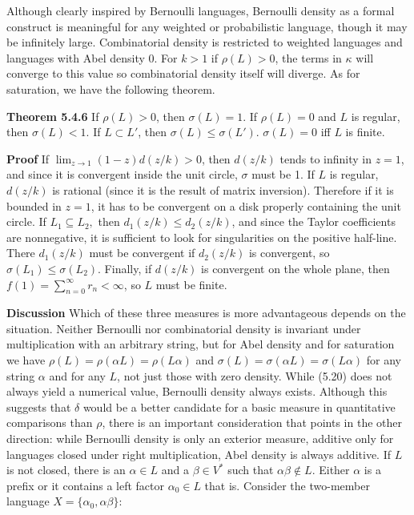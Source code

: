 Although clearly inspired by Bernoulli languages, Bernoulli density as a formal
construct is meaningful for any weighted or probabilistic language, though it
may be infinitely large. Combinatorial density is restricted to weighted
languages and languages with Abel density 0. For $k >1$ if $\rho(L)>0$, the
terms in $\kappa$ will converge to this value so combinatorial density itself
will diverge. As for saturation, we have the following theorem.

\medskip\noindent
{\bf Theorem 5.4.6} If $\rho(L) > 0$, then $\sigma(L)=1$. If $\rho(L) =0$ and
$L$ is regular, then $\sigma(L) < 1$. If $L \subset L'$, then $\sigma(L) \leq
\sigma(L')$. $\sigma(L)=0$ iff $L$ is finite. 

\bigskip\noindent
{\bf Proof} If $\lim_{z \rightarrow 1} (1-z)d(z/k) > 0$, then 
$d(z/k)$ tends to infinity in $z=1$, and since it is convergent inside the 
unit circle, $\sigma$ must be 1. If $L$ is regular, $d(z/k)$ is rational
(since it is the result of matrix inversion). Therefore if it is bounded in 
$z=1$, it has to be convergent on a disk properly containing the unit circle.
If $L_1 \subseteq L_2,$ then $d_1(z/k) \leq d_2(z/k)$, and since the Taylor
coefficients are nonnegative, it is sufficient to look for singularities on
the positive half-line. There $d_1(z/k)$ must be convergent if $d_2(z/k)$
is convergent, so $\sigma (L_1) \leq \sigma (L_2)$. Finally, if $d(z/k)$ is 
convergent on the whole plane, then $f(1)=\sum_{n=0}^{\infty} r_n < \infty$,
so $L$ must be finite.

\medskip\noindent 
{\bf Discussion} 
Which of these three measures is more advantageous depends on the situation.
Neither Bernoulli nor combinatorial density is invariant under multiplication
with an arbitrary string, but for Abel density and for saturation we have
$\rho(L)=\rho(\alpha L)=\rho(L\alpha)$ and $\sigma(L)=\sigma(\alpha L)=
\sigma(L\alpha)$ for any string $\alpha$ and for any $L$, not just those with
zero density. While (5.20) does not always yield a numerical value, Bernoulli
density always exists. Although this suggests that $\delta$ would be a better
candidate for a basic measure in quantitative comparisons than $\rho$, 
there is an important consideration that points in the other direction: while
Bernoulli density is only an exterior measure, additive only for languages
closed under right multiplication, Abel density is always additive. If $L$ is
not closed, there is an $\alpha \in L$ and a $\beta \in V^*$ such that
$\alpha\beta \not\in L$.  Either $\alpha$ is a prefix or it contains a left
factor $\alpha_0 \in L$ that is.  Consider the two-member language
$X=\{\alpha_0,\alpha\beta\}$:

